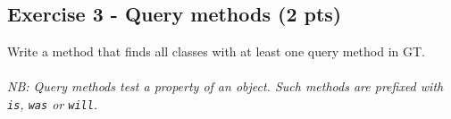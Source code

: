 \documentclass [11pt, a4wide, twoside]{article}
\begin{document}
\subsection*{Exercise 3 - Query methods (2 pts)}
Write a method that finds all classes with at least one query method in GT.\\\\
\textit{NB: Query methods test a property of an object. Such methods are prefixed with \texttt{is}, \texttt{was} or \texttt{will}.}

\end{document}
